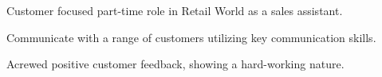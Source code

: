     \sectionspace %

        \begin{tightitemize}
            \item Customer focused part-time role in Retail World as a sales assistant.
            \item Communicate with a range of customers utilizing key communication skills.
            \item Acrewed positive customer feedback, showing a hard-working nature.
        \end{tightitemize}

    \sectionspace %